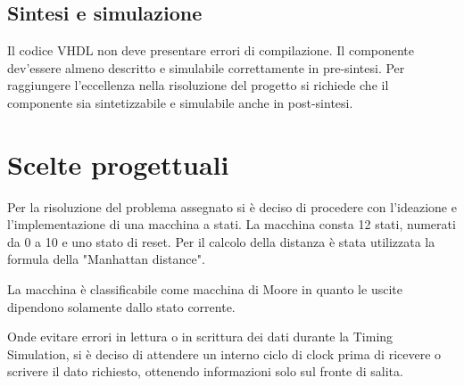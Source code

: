 \documentclass[a4paper,12pt]{article}
\begin{document}
\subsection{Sintesi e simulazione}
Il codice VHDL non deve presentare errori di compilazione. Il componente dev'essere almeno descritto e simulabile correttamente in pre-sintesi. Per raggiungere l'eccellenza nella risoluzione del progetto si richiede che il componente sia sintetizzabile e simulabile anche in post-sintesi.

\section{Scelte progettuali}
Per la risoluzione del problema assegnato si è deciso di procedere con l'ideazione e l'implementazione di una macchina a stati. La macchina consta 12 stati, numerati da 0 a 10 e uno stato di reset. 
Per il calcolo della distanza è stata utilizzata la formula della "Manhattan distance".

La macchina è classificabile come macchina di Moore in quanto le uscite dipendono solamente dallo stato corrente.

Onde evitare errori in lettura o in scrittura dei dati durante la Timing Simulation, si è deciso di attendere un interno ciclo di clock prima di ricevere o scrivere il dato richiesto, ottenendo informazioni solo sul fronte di salita.
\end{document}
